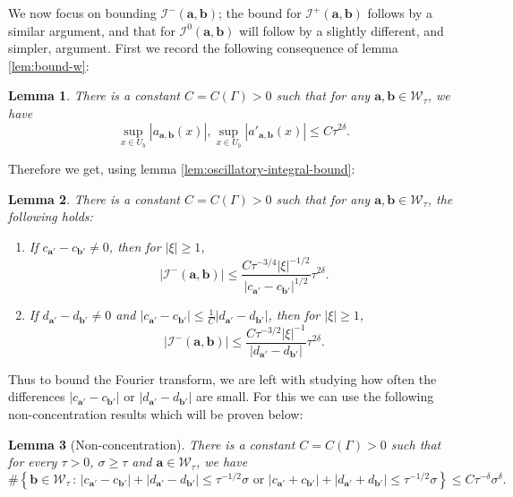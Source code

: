 \documentclass[12pt]{amsart}
\newcommand*\abs[1]{
	\left|#1\right|
}
\newtheorem{lem}{Lemma}[section]
\theoremstyle{definition}
\renewcommand{\leq}{\leqslant}
\renewcommand{\geq}{\geqslant}
\begin{document}
We now focus on bounding $\mathcal{I}^-(\mathbf{a}, \mathbf{b})$; the bound for $\mathcal{I}^+(\mathbf{a}, \mathbf{b})$ follows by a similar argument, and that for $\mathcal{I}^0(\mathbf{a}, \mathbf{b})$ will follow by a slightly different, and simpler, argument. First we record the following consequence of lemma \ref{lem:bound-w}:
\begin{lem}
There is a constant $C = C(\Gamma) > 0$ such that for any $\mathbf{a}, \mathbf{b} \in \mathcal{W}_\tau$, we have
\[\sup_{x\in U_b} \abs{a_{\mathbf{a},\mathbf{b}}(x)}, \sup_{x\in U_b} \abs{a'_{\mathbf{a},\mathbf{b}}(x)} \leq C\tau^{2\delta}.\]
\end{lem}
Therefore we get, using lemma \ref{lem:oscillatory-integral-bound}:
\begin{lem}
\label{lem:bound-pieces}
There is a constant $C = C(\Gamma) > 0$ such that for any $\mathbf{a}, \mathbf{b} \in \mathcal{W}_\tau$, the following holds:
\begin{enumerate}
\item If $c_{\mathbf{a}'} - c_{\mathbf{b}'} \neq 0$, then for $\abs{\xi} \geq 1$,
\[\abs{\mathcal{I}^{-}(\mathbf{a}, \mathbf{b})} \leq \frac{C\tau^{-3/4}\abs{\xi}^{-1/2}}{\abs{c_{\mathbf{a}'} - c_{\mathbf{b}'}}^{1/2}}\tau^{2\delta}.\]
\item If $d_{\mathbf{a}'} - d_{\mathbf{b}'} \neq 0$ and $\abs{c_{\mathbf{a}'} - c_{\mathbf{b}'}} \leq \frac{1}{C}\abs{d_{\mathbf{a}'} - d_{\mathbf{b}'}}$, then for $\abs{\xi} \geq 1$,
\[\abs{\mathcal{I}^{-}(\mathbf{a}, \mathbf{b})} \leq \frac{C\tau^{-3/2}\abs{\xi}^{-1}}{\abs{d_{\mathbf{a}'} - d_{\mathbf{b}'}}}\tau^{2\delta}.\] 
\end{enumerate}
\end{lem}

Thus to bound the Fourier transform, we are left with studying how often the differences $\abs{c_{\mathbf{a}'} - c_{\mathbf{b}'}}$ or $\abs{d_{\mathbf{a}'} - d_{\mathbf{b}'}}$ are small. For this we can use the following non-concentration results which will be proven below: 
\begin{lem}[Non-concentration]\label{lem:nonconcentration}
There is a constant $C = C(\Gamma) > 0$ such that for every $\tau > 0$, $\sigma \geq \tau$ and $\mathbf{a} \in \mathcal{W}_\tau$, we have
\[\#\left\{\mathbf{b} \in \mathcal{W}_\tau\,:\, \abs{c_{\mathbf{a}'} - c_{\mathbf{b}'}} + \abs{d_{\mathbf{a}'} - d_{\mathbf{b}'}} \leq \tau^{-1/2}\sigma 
\text{ or } \abs{c_{\mathbf{a}'} + c_{\mathbf{b}'}} + \abs{d_{\mathbf{a}'} + d_{\mathbf{b}'}} \leq \tau^{-1/2}\sigma \right\} \leq C\tau^{-\delta}\sigma^\delta.\]
\end{lem}
\end{document}
